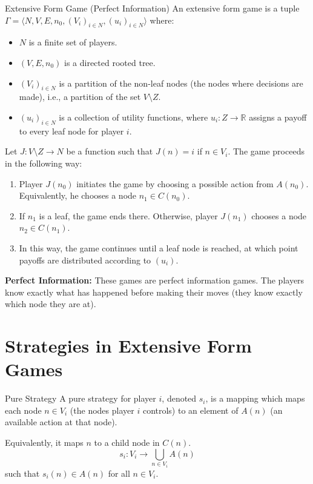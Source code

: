 \documentclass[12pt, a4paper]{article}
\begin{document}
\begin{defbox}{Extensive Form Game (Perfect Information)}
  An extensive form game is a tuple $\Gamma = \langle N, V, E, n_0, (V_i)_{i \in N}, (u_i)_{i \in N} \rangle$ where:
  \begin{itemize}
      \item $N$ is a finite set of players.
      \item $(V, E, n_0)$ is a directed rooted tree.
      \item $(V_i)_{i \in N}$ is a partition of the non-leaf nodes (the nodes where decisions are made), i.e., a partition of the set $V \setminus Z$.
      \item $(u_i)_{i \in N}$ is a collection of utility functions, where $u_i : Z \to \mathbb{R}$ assigns a payoff to every leaf node for player $i$.
  \end{itemize}
\end{defbox}

Let $J: V \setminus Z \to N$ be a function such that $J(n) = i$ if $n \in V_i$. 
The game proceeds in the following way:
\begin{enumerate}
    \item Player $J(n_0)$ initiates the game by choosing a possible action from $A(n_0)$. Equivalently, he chooses a node $n_1 \in C(n_0)$.
    \item If $n_1$ is a leaf, the game ends there. Otherwise, player $J(n_1)$ chooses a node $n_2 \in C(n_1)$.
    \item In this way, the game continues until a leaf node is reached, at which point payoffs are distributed according to $(u_i)$.
\end{enumerate}

\begin{notebox}
\textbf{Perfect Information:}
These games are perfect information games. The players know exactly what has happened before making their moves (they know exactly which node they are at).
\end{notebox}

\section{Strategies in Extensive Form Games}

\begin{defbox}{Pure Strategy}
  A pure strategy for player $i$, denoted $s_i$, is a mapping which maps each node $n \in V_i$ (the nodes player $i$ controls) to an element of $A(n)$ (an available action at that node). 
  
  Equivalently, it maps $n$ to a child node in $C(n)$.
  \[ s_i : V_i \to \bigcup_{n \in V_i} A(n) \]
  such that $s_i(n) \in A(n)$ for all $n \in V_i$.
\end{defbox}
\end{document}
